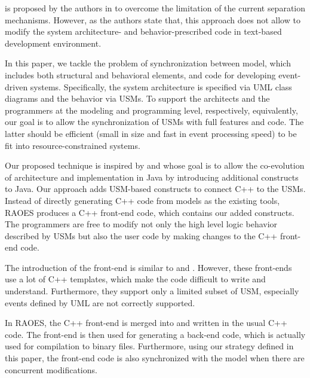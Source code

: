  is proposed by the authors in \cite{zheng2012enhancing} to overcome the limitation of the current separation mechanisms.
However, as the authors state that, this approach does not allow to modify the system architecture- and behavior-prescribed code in text-based development environment.  

In this paper, we tackle the problem of synchronization between model, which includes both structural and behavioral elements, and  code for developing event-driven systems.
Specifically, the system architecture is specified via UML class diagrams and the behavior via USMs.
To support the architects and the programmers at the modeling and programming level, respectively, equivalently, our goal is to allow the synchronization of USMs with full features and code.
The latter should be efficient (small in size and fast in event processing speed) to be fit into resource-constrained systems. 

Our proposed technique  is inspired by  \cite{aldrich2002archjava} and  \cite{ubayashi2010archface} whose goal is to allow the co-evolution of architecture and implementation in Java by introducing additional constructs to Java.
Our approach adds USM-based constructs to connect C++ to the USMs.
Instead of directly generating C++ code from models as the existing tools, RAOES produces a C++ front-end code, which contains our added constructs.
The programmers are free to modify not only the high level logic behavior described by USMs but also the user code by making changes to the C++ front-end code.

The introduction of the front-end is similar to  \cite{MSM} and  \cite{EUML}.
However, these front-ends use a lot of C++ templates, which make the code difficult to write and understand.
Furthermore, they support only a limited subset of USM, especially events defined by UML are not correctly supported.

In RAOES, the C++ front-end is merged into and written in the usual C++ code.
The front-end is then used for generating a back-end code, which is actually used for compilation to binary files.
Furthermore, using our strategy defined in this paper, the front-end code is also synchronized with the model when there are concurrent modifications.


